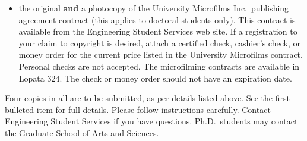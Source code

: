 \begin{itemize}
  \item the \uline{original \textbf{and} a photocopy of the University
	  Microfilms Inc.\ publishing agree\-ment contract} (this applies to
	  doctoral students only).  This contract is available from the
	  Engineering Student Services web site.  If a registration to your
	  claim to copyright is desired, attach a certified check, cashier's
	  check, or money order for the current price listed in the University
	  Microfilms contract.  Personal checks are not accepted.  The
	  microfilming contracts are available in Lopata 324.  The check or
	  money order should not have an expiration date.
\end{itemize}

Four copies in all are to be submitted, as per details listed above.  See the
first bulleted item for full details.  Please follow instructions carefully.
Contact Engineering Student Services if you have questions.  Ph.D.\ students
may contact the Graduate School of Arts and Sciences.

